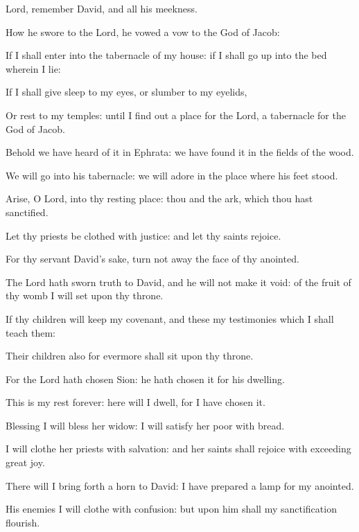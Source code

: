 ﻿\item Lord, remember David, and all his meekness.
\item How he swore to the Lord, he vowed a vow to the God of Jacob:
\item If I shall enter into the tabernacle of my house: if I shall go up into the bed wherein I lie:
\item If I shall give sleep to my eyes, or slumber to my eyelids,
\item Or rest to my temples: until I find out a place for the Lord, a tabernacle for the God of Jacob.
\item Behold we have heard of it in Ephrata: we have found it in the fields of the wood.
\item We will go into his tabernacle: we will adore in the place where his feet stood.
\item Arise, O Lord, into thy resting place: thou and the ark, which thou hast sanctified.
\item Let thy priests be clothed with justice: and let thy saints rejoice. 
\item For thy servant David's sake, turn not away the face of thy anointed.
\item The Lord hath sworn truth to David, and he will not make it void: of the fruit of thy womb I will set upon thy throne.
\item If thy children will keep my covenant, and these my testimonies which I shall teach them:
\item Their children also for evermore shall sit upon thy throne. 
\item For the Lord hath chosen Sion: he hath chosen it for his dwelling.
\item This is my rest forever: here will I dwell, for I have chosen it.
\item Blessing I will bless her widow: I will satisfy her poor with bread.
\item I will clothe her priests with salvation: and her saints shall rejoice with exceeding great joy.
\item There will I bring forth a horn to David: I have prepared a lamp for my anointed.
\item His enemies I will clothe with confusion: but upon him shall my sanctification flourish.